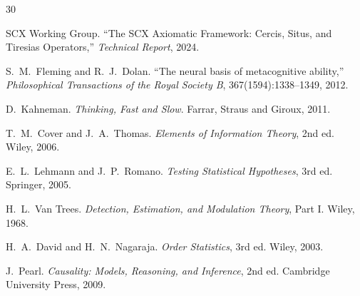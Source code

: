\documentclass[12pt,a4paper]{article}
\begin{document}

\begin{thebibliography}{30}

SCX Working Group.
\newblock ``The SCX Axiomatic Framework: Cercis, Situs, and Tiresias Operators,''
\newblock \emph{Technical Report}, 2024.

S.~M.~Fleming and R.~J.~Dolan.
\newblock ``The neural basis of metacognitive ability,''
\newblock \emph{Philosophical Transactions of the Royal Society B},
367(1594):1338--1349, 2012.

D.~Kahneman.
\newblock \emph{Thinking, Fast and Slow}.
\newblock Farrar, Straus and Giroux, 2011.

T.~M.~Cover and J.~A.~Thomas.
\newblock \emph{Elements of Information Theory}, 2nd ed.
\newblock Wiley, 2006.

E.~L.~Lehmann and J.~P.~Romano.
\newblock \emph{Testing Statistical Hypotheses}, 3rd ed.
\newblock Springer, 2005.

H.~L.~Van Trees.
\newblock \emph{Detection, Estimation, and Modulation Theory}, Part I.
\newblock Wiley, 1968.

H.~A.~David and H.~N.~Nagaraja.
\newblock \emph{Order Statistics}, 3rd ed.
\newblock Wiley, 2003.

J.~Pearl.
\newblock \emph{Causality: Models, Reasoning, and Inference}, 2nd ed.
\newblock Cambridge University Press, 2009.

\end{thebibliography}
\end{document}
